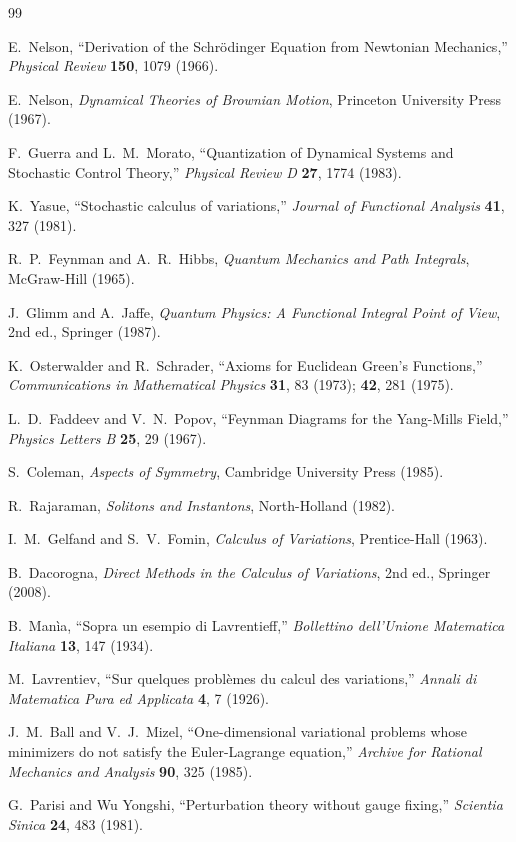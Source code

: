 \documentclass[11pt]{article}
\begin{document}
\begin{thebibliography}{99}

 E.~Nelson, ``Derivation of the Schr\"odinger Equation from Newtonian Mechanics,'' \textit{Physical Review} \textbf{150}, 1079 (1966).

 E.~Nelson, \textit{Dynamical Theories of Brownian Motion}, Princeton University Press (1967).

 F.~Guerra and L.~M.~Morato, ``Quantization of Dynamical Systems and Stochastic Control Theory,'' \textit{Physical Review D} \textbf{27}, 1774 (1983).

 K.~Yasue, ``Stochastic calculus of variations,'' \textit{Journal of Functional Analysis} \textbf{41}, 327 (1981).

 R.~P.~Feynman and A.~R.~Hibbs, \textit{Quantum Mechanics and Path Integrals}, McGraw-Hill (1965).

 J.~Glimm and A.~Jaffe, \textit{Quantum Physics: A Functional Integral Point of View}, 2nd ed., Springer (1987).

 K.~Osterwalder and R.~Schrader, ``Axioms for Euclidean Green's Functions,'' \textit{Communications in Mathematical Physics} \textbf{31}, 83 (1973); \textbf{42}, 281 (1975).

 L.~D.~Faddeev and V.~N.~Popov, ``Feynman Diagrams for the Yang-Mills Field,'' \textit{Physics Letters B} \textbf{25}, 29 (1967).

 S.~Coleman, \textit{Aspects of Symmetry}, Cambridge University Press (1985).

 R.~Rajaraman, \textit{Solitons and Instantons}, North-Holland (1982).

 I.~M.~Gelfand and S.~V.~Fomin, \textit{Calculus of Variations}, Prentice-Hall (1963).

 B.~Dacorogna, \textit{Direct Methods in the Calculus of Variations}, 2nd ed., Springer (2008).

 B.~Man\`ia, ``Sopra un esempio di Lavrentieff,'' \textit{Bollettino dell'Unione Matematica Italiana} \textbf{13}, 147 (1934).

 M.~Lavrentiev, ``Sur quelques probl\`emes du calcul des variations,'' \textit{Annali di Matematica Pura ed Applicata} \textbf{4}, 7 (1926).

 J.~M.~Ball and V.~J.~Mizel, ``One-dimensional variational problems whose minimizers do not satisfy the Euler-Lagrange equation,'' \textit{Archive for Rational Mechanics and Analysis} \textbf{90}, 325 (1985).

 G.~Parisi and Wu Yongshi, ``Perturbation theory without gauge fixing,'' \textit{Scientia Sinica} \textbf{24}, 483 (1981).

\end{thebibliography}
\end{document}
